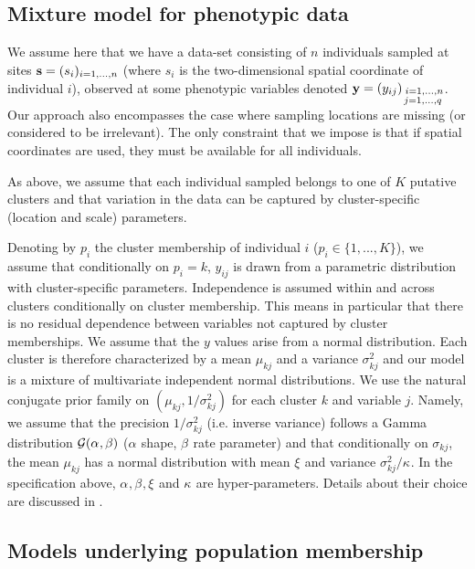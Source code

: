 \documentclass[a4paper,10pt]{article}
\begin{document}
\subsection{Mixture model for phenotypic data}\label{sec:pheno}
We assume here  that we have a data-set consisting of  $n$ individuals sampled at sites ${\bf s}=(s_i)_{i=1,...,n}$ 
(where $s_i$ is the two-dimensional spatial coordinate of individual $i$),  
observed at some phenotypic variables denoted  ${\bf y}=(y_{ij})_{\substack{\;i=1,...,n \\j=1,...,q}}$.
 Our approach also encompasses the case where sampling locations are missing (or considered to be 
irrelevant). The only constraint that we impose is that if spatial coordinates are used, 
they must be available for all individuals.

As above, we assume that each  individual sampled belongs to one of $K$ putative clusters 
and that variation in the data 
can be captured by cluster-specific (location and scale) parameters. 


Denoting by $p_i$ the cluster membership of individual $i$ ($p_i \in \{1,...,K\}$), 
we assume that conditionally on $p_i=k$, $y_{ij}$ is drawn from a parametric distribution with cluster-specific parameters. 
Independence is assumed within and across clusters  conditionally on cluster membership. This means in particular that 
there is no residual dependence between variables not captured by cluster memberships. 
We assume  that the $y$ values arise from  a  normal distribution. 
Each cluster is  therefore characterized by a mean $\mu_{kj}$ and a variance $\sigma^2_{kj}$
and our model is a mixture of multivariate independent normal distributions. 
We use the natural conjugate prior family on 
 $(\mu_{kj},1/\sigma^2_{kj})$ for each cluster $k$ and variable $j$.
Namely, we  assume that the precision $1/\sigma^2_{kj}$ (i.e.  inverse variance)  follows  a Gamma distribution ${\cal G}(\alpha_{},\beta_{})$
($\alpha_{}$ shape, $\beta_{}$ rate parameter) and that conditionally on $\sigma_{kj}$, the mean $\mu_{kj} $ has a normal distribution  with 
mean $\xi_{}$ and variance $\sigma^2_{kj} / \kappa_{}$. 
In the specification above, $\alpha_{},\beta_{}, \xi_{}$ and $\kappa_{}$ are hyper-parameters. Details about their choice 
are  discussed in \citet{Guillot12a}. 


\clearpage
\subsection{Models underlying population membership}\label{sec:mbrship}
\end{document}
